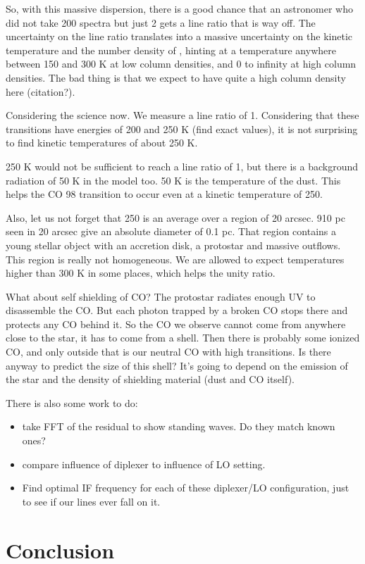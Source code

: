 So, with this massive dispersion, there is a good chance that an astronomer who did not take 200 spectra but just 2 gets a line ratio that is way off.
The uncertainty on the line ratio translates into a massive uncertainty on the kinetic temperature and the number density of , hinting at a temperature anywhere between 150 and 300 K at low column densities, and 0 to infinity at high column densities.
The bad thing is that we expect to have quite a high column density here (citation?).

Considering the science now.  We measure a line ratio of 1.  Considering that these transitions have energies of 200 and 250 K (find exact values), it is not surprising to find kinetic temperatures of about 250 K.

250 K would not be sufficient to reach a line ratio of 1, but there is a background radiation of 50 K in the model too.  50 K is the temperature of the dust.  This helps the CO 98 transition to occur even at a kinetic temperature of 250.

Also, let us not forget that 250 is an average over a region of 20 arcsec.  910 pc seen in 20 arcsec give an absolute diameter of 0.1 pc.  That region contains a young stellar object with an accretion disk, a protostar and massive outflows.  This region is really not homogeneous.  We are allowed to expect temperatures higher than 300 K in some places, which helps the unity ratio.

What about self shielding of CO?  The protostar radiates enough UV to disassemble the CO.  But each photon trapped by a broken CO stops there and protects any CO behind it.  So the CO we observe cannot come from anywhere close to the star, it has to come from a shell.  Then there is probably some ionized CO, and only outside that is our neutral CO with high transitions.  Is there anyway to predict the size of this shell?  It's going to depend on the emission of the star and the density of shielding material (dust and CO itself).

There is also some work to do:
\begin{itemize}
    \item take FFT of the residual to show standing waves.  Do they match known ones?
    \item compare influence of diplexer to influence of LO setting.
    \item Find optimal IF frequency for each of these diplexer/LO configuration, just to see if our lines ever fall on it.
\end{itemize}

\section{Conclusion}
